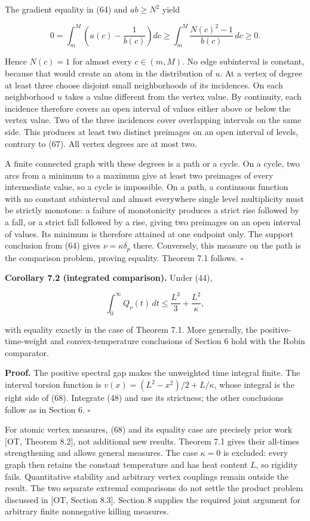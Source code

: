 \documentclass[11pt]{article}
\begin{document}
The gradient equality in (64) and \(ab\ge N^2\) yield

\[
0=\int_m^M\left(a(c)-\frac1{b(c)}\right)dc
\ge\int_m^M\frac{N(c)^2-1}{b(c)}\,dc\ge0.
\tag{67}
\]

Hence \(N(c)=1\) for almost every \(c\in(m,M)\). No edge subinterval is
constant, because that would create an atom in the distribution of
\(u\). At a vertex of degree at least three choose disjoint small
neighborhoods of its incidences. On each neighborhood \(u\) takes a
value different from the vertex value. By continuity, each incidence
therefore covers an open interval of values either above or below the
vertex value. Two of the three incidences cover overlapping intervals on
the same side. This produces at least two distinct preimages on an open
interval of levels, contrary to (67). All vertex degrees are at most
two.

A finite connected graph with these degrees is a path or a cycle. On a
cycle, two arcs from a minimum to a maximum give at least two preimages
of every intermediate value, so a cycle is impossible. On a path, a
continuous function with no constant subinterval and almost everywhere
single level multiplicity must be strictly monotone: a failure of
monotonicity produces a strict rise followed by a fall, or a strict fall
followed by a rise, giving two preimages on an open interval of values.
Its minimum is therefore attained at one endpoint only. The support
conclusion from (64) gives \(\nu=\kappa\delta_p\) there. Conversely,
this measure on the path is the comparison problem, proving equality.
Theorem 7.1 follows. \(\square\)

\textbf{Corollary 7.2 (integrated comparison).} Under (44),

\[
\int_0^\infty Q_\nu(t)\,dt
\le\frac{L^3}{3}+\frac{L^2}{\kappa},
\tag{68}
\]

with equality exactly in the case of Theorem 7.1. More generally, the
positive-time-weight and convex-temperature conclusions of Section 6
hold with the Robin comparator.

\textbf{Proof.} The positive spectral gap makes the unweighted time
integral finite. The interval torsion function is
\(v(x)=(L^2-x^2)/2+L/\kappa\), whose integral is the right side of (68).
Integrate (48) and use its strictness; the other conclusions follow as
in Section 6. \(\square\)

For atomic vertex measures, (68) and its equality case are precisely
prior work {[}OT, Theorem 8.2{]}, not additional new results. Theorem
7.1 gives their all-times strengthening and allows general measures. The
case \(\kappa=0\) is excluded: every graph then retains the constant
temperature and has heat content \(L\), so rigidity fails. Quantitative
stability and arbitrary vertex couplings remain outside the result. The
two separate extremal comparisons do not settle the product problem
discussed in {[}OT, Section 8.3{]}. Section 8 supplies the required
joint argument for arbitrary finite nonnegative killing measures.
\end{document}
